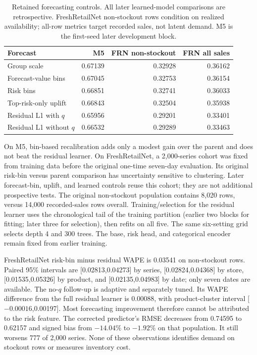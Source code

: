 \begin{table}[htbp]\centering\small
\caption{Retained forecasting controls. All later learned-model comparisons are retrospective. FreshRetailNet non-stockout rows condition on realized availability; all-row metrics target recorded sales, not latent demand. M5 is the first-seed later development block.}
\label{tab:forecast-controls}
\begin{tabular}{lrrr}\toprule
Forecast & M5 & FRN non-stockout & FRN all sales\\\midrule
Group scale & 0.67139 & 0.32928 & 0.36162\\
Forecast-value bins & 0.67045 & 0.32753 & 0.36154\\
Risk bins & 0.66851 & 0.32741 & 0.36033\\
Top-risk-only uplift & 0.66843 & 0.32504 & 0.35938\\
Residual L1 with $q$ & 0.65956 & 0.29201 & 0.33401\\
Residual L1 without $q$ & 0.66532 & 0.29289 & 0.33463\\\bottomrule
\end{tabular}\end{table}

On M5, bin-based recalibration adds only a modest gain over the parent and does not beat the residual learner. On FreshRetailNet, a 2,000-series cohort was fixed from training data before the original one-time seven-day evaluation. Its original risk-bin versus parent comparison has uncertainty sensitive to clustering. Later forecast-bin, uplift, and learned controls reuse this cohort; they are not additional prospective tests. The original non-stockout population contains 8,020 rows, versus 14,000 recorded-sales rows overall. Training/selection for the residual learner uses the chronological tail of the training partition (earlier two blocks for fitting; later three for selection), then refits on all five. The same six-setting grid selects depth 4 and 300 trees. The base, risk head, and categorical encoder remain fixed from earlier training.

FreshRetailNet risk-bin minus residual WAPE is 0.03541 on non-stockout rows. Paired 95\% intervals are [0.02813,0.04273] by series, [0.02824,0.04368] by store, [0.01535,0.05326] by product, and [0.02135,0.04983] by date; only seven dates are available. The no-$q$ follow-up is adaptive and separately tuned. Its WAPE difference from the full residual learner is 0.00088, with product-cluster interval [$-0.00016$,0.00197]. Most forecasting improvement therefore cannot be attributed to the risk feature. The corrected predictor's RMSE decreases from 0.74595 to 0.62157 and signed bias from $-14.04\%$ to $-1.92\%$ on that population. It still worsens 777 of 2,000 series. None of these observations identifies demand on stockout rows or measures inventory cost.


